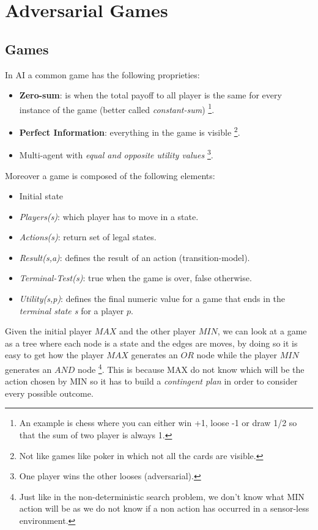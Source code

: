 \documentclass[10pt,a4paper]{article}
\begin{document}
\newpage


\section{Adversarial Games}
\subsection{Games}
In AI a common game has the following proprieties:

\begin{itemize}
\item \textbf{Zero-sum}: is when the total payoff to all player is the same for every instance of the game (better called \textit{constant-sum}) \footnote{An example is chess where you can either win +1, loose -1 or draw 1/2 so that the sum of two player is always 1.}.

\item \textbf{Perfect Information}: everything in the game is visible \footnote{Not like games like poker in which not all the cards are visible.}.

\item Multi-agent with \textit{equal and opposite utility values} \footnote{One player wins the other looses (adversarial).}.

\end{itemize}


Moreover a game is composed of the following elements:
\begin{itemize}
\item Initial state
\item \textit{Players(s)}: which player has to move in a state.
\item \textit{Actions(s)}: return set of legal states.
\item \textit{Result(s,a)}: defines the result of an action (transition-model).
\item \textit{Terminal-Test(s)}: true when the game is over, false otherwise.
\item \textit{Utility(s,p)}: defines the final numeric value for a game that ends in the \textit{terminal state s} for a player $p$.
\end{itemize}

Given the initial player $MAX$ and the other player $MIN$,
we can look at a game as a tree where each node is a state and the edges are moves, by doing so it is easy to get how the player $MAX$ generates an $OR$ node while the player $MIN$ generates an $AND$ node \footnote{Just like in the non-deterministic search problem, we don't know what MIN action will be as we do not know if a non action has occurred in a sensor-less environment.}. This is because MAX do not know which will be the action chosen by MIN so it has to build a \textit{contingent plan} in order to consider every possible outcome.\\
\end{document}
